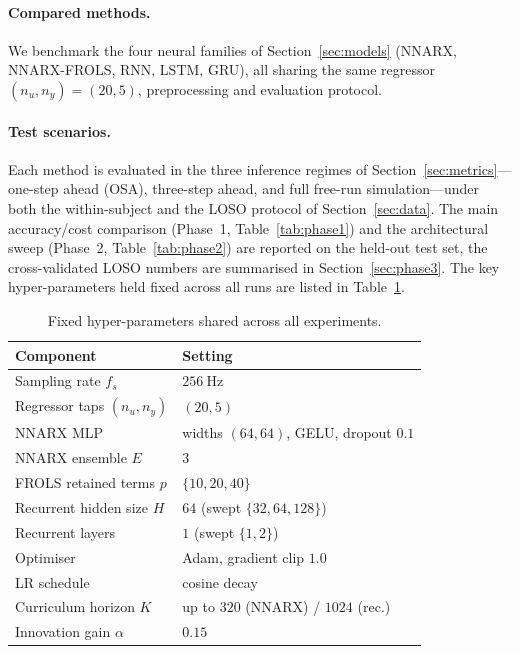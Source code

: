 \documentclass[10pt,twocolumn,letterpaper]{article}
\begin{document}
\paragraph{Compared methods.}
We benchmark the four neural families of Section~\ref{sec:models}
(NNARX, NNARX-FROLS, RNN, LSTM, GRU), all sharing the same regressor
$(n_u,n_y)=(20,5)$, preprocessing and evaluation protocol.

\paragraph{Test scenarios.}
Each method is evaluated in the three inference regimes of
Section~\ref{sec:metrics}---one-step ahead (OSA), three-step ahead, and
full free-run simulation---under both the within-subject and the LOSO
protocol of Section~\ref{sec:data}. The main accuracy/cost comparison
(Phase~1, Table~\ref{tab:phase1}) and the architectural sweep (Phase~2,
Table~\ref{tab:phase2}) are reported on the held-out test set, the
cross-validated LOSO numbers are summarised in Section~\ref{sec:phase3}.
The key hyper-parameters held fixed across all runs are listed in
Table~\ref{tab:hparams}.

\begin{table}[t]
\centering
\caption{Fixed hyper-parameters shared across all experiments.}
\label{tab:hparams}
\small
\setlength{\tabcolsep}{4pt}
\begin{tabular}{ll}
\toprule
\textbf{Component} & \textbf{Setting} \\
\midrule
Sampling rate $f_s$ & $256~\mathrm{Hz}$ \\
Regressor taps $(n_u,n_y)$ & $(20,5)$ \\
NNARX MLP & widths $(64,64)$, GELU, dropout $0.1$ \\
NNARX ensemble $E$ & $3$ \\
FROLS retained terms $p$ & $\{10,20,40\}$ \\
Recurrent hidden size $H$ & $64$ (swept $\{32,64,128\}$) \\
Recurrent layers & $1$ (swept $\{1,2\}$) \\
Optimiser & Adam, gradient clip $1.0$ \\
LR schedule & cosine decay \\
Curriculum horizon $K$ & up to $320$ (NNARX) / $1024$ (rec.) \\
Innovation gain $\alpha$ & $0.15$ \\
\bottomrule
\end{tabular}
\end{table}
\end{document}
